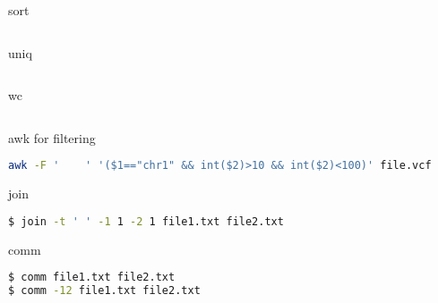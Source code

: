\documentclass{beamer}
\begin{document}
\begin{frame}[fragile]
 \begin{center}
    \huge{sort}\\
    \end{center}
\begin{lstlisting}[language=bash]

\end{lstlisting}
\end{frame}


\begin{frame}[fragile]
 \begin{center}
    \huge{uniq}\\
    \end{center}
\begin{lstlisting}[language=bash]

\end{lstlisting}
\end{frame}


\begin{frame}[fragile]
 \begin{center}
    \huge{wc}\\
    \end{center}
\begin{lstlisting}[language=bash]

\end{lstlisting}
\end{frame}


\begin{frame}[fragile]
 \begin{center}
    \huge{awk for filtering}\\
    \end{center}
\begin{lstlisting}[language=bash]
awk -F '	' '($1=="chr1" && int($2)>10 && int($2)<100)' file.vcf
\end{lstlisting}
\end{frame}

\begin{frame}[fragile]
 \begin{center}
    \huge{join}\\
    \end{center}
\begin{lstlisting}[language=bash]
$ join -t '	' -1 1 -2 1 file1.txt file2.txt
\end{lstlisting}
\end{frame}

\begin{frame}[fragile]
 \begin{center}
    \huge{comm}\\
    \end{center}
\begin{lstlisting}[language=bash]
$ comm file1.txt file2.txt
$ comm -12 file1.txt file2.txt
\end{lstlisting}
\end{frame}
\end{document}
